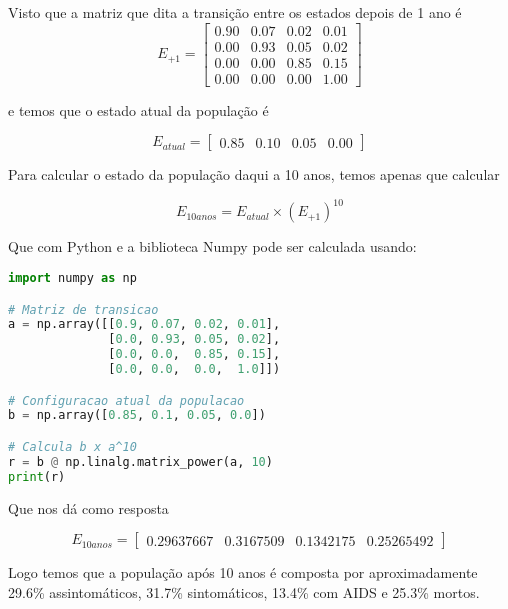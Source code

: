 \documentclass[11pt]{article}
\begin{document}
\begin{exerc}
\begin{enumerate}
Visto que a matriz que dita a transição entre os estados depois de 1 ano é
\[
E_{+1} =
\begin{bmatrix}
    0.90 & 0.07 & 0.02 & 0.01 \\
    0.00 & 0.93 & 0.05 & 0.02 \\
    0.00 & 0.00 & 0.85 & 0.15 \\
    0.00 & 0.00 & 0.00 & 1.00
\end{bmatrix}
\]

e temos que o estado atual da população é

\[
E_{atual} = 
\begin{bmatrix}
    0.85 & 0.10 & 0.05 & 0.00
\end{bmatrix}
\]

Para calcular o estado da população daqui a 10 anos, temos apenas que calcular

$$E_{10 anos} = E_{atual} \times (E_{+1})^{10}$$

Que com Python e a biblioteca Numpy pode ser calculada usando:

\begin{lstlisting}[language=Python]
import numpy as np

# Matriz de transicao
a = np.array([[0.9, 0.07, 0.02, 0.01],
              [0.0, 0.93, 0.05, 0.02],
              [0.0, 0.0,  0.85, 0.15],
              [0.0, 0.0,  0.0,  1.0]])

# Configuracao atual da populacao
b = np.array([0.85, 0.1, 0.05, 0.0])

# Calcula b x a^10
r = b @ np.linalg.matrix_power(a, 10)
print(r)
\end{lstlisting}

Que nos dá como resposta

\[
E_{10anos} = 
\begin{bmatrix}
    0.29637667 & 0.3167509 & 0.1342175 & 0.25265492
\end{bmatrix}
\]

Logo temos que a população após 10 anos é composta por aproximadamente 29.6\% assintomáticos, 31.7\% sintomáticos, 13.4\% com AIDS e 25.3\% mortos.

\end{enumerate}
\end{exerc}

\newpage
\end{document}
